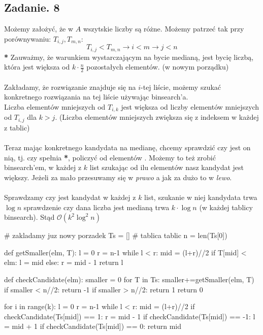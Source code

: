 \documentclass{article}
\begin{document}
\subsection*{Zadanie. 8}
Możemy założyć, że w $A$ wszytskie liczby są różne. Możemy patrzeć tak przy porównywaniu: $T_{i,j}, T_{m,n}$:
$$
T_{i,j} < T_{m,n} \rightarrow i < m \rightarrow j < n
$$
\textbf{*} Zauważmy, że warunkiem wystarczającym na bycie medianą, jest bycię liczbą, która jest większa od $k\cdot\frac{n}{2}$ pozostałych elementów. (w nowym porządku)\\\\
Zakładamy, że rozwiązanie znajduje się na $i$-tej liście, możemy szukać konkretnego rozwiązania na tej liście używając binsearch'a.\\Liczba elementów mniejszych od $T_{i,k}$ jest większa od liczby elementów mniejszych od $T_{i,j}$ dla $k>j$. (Liczba elementów mniejszych zwiększa się z indeksem w każdej z tablic)\\\\
Teraz mając konkretnego kandydata na medianę, chcemy sprawdzić czy jest on nią, tj. czy spełnia \textbf{*}, policzyć od elementów . Możemy to też zrobić binsearch'em, w każdej z $k$ list szukając od ilu elementów nasz kandydat jest większy.
Jeżeli za mało przesuwamy się w \textit{prawo} a jak za dużo to w \textit{lewo}.\\\\
Sprawdzamy czy jest kandydat w każdej z $k$ list, szukanie w niej kandydata trwa $\log{n}$ sprawdzenie czy dana liczba jest medianą trwa $k\cdot \log{n}$ (w każdej tablicy binsearch). Stąd $\mathcal{O}(k^2\log^2{n})$
\clearpage
\begin{python}
# zakladamy juz nowy porzadek
Ts = [] # tablica tablic
n = len(Ts[0])

def getSmaller(elm, T):
    l = 0
    r = n-1
    while l < r:
        mid = (l+r)//2
        if T[mid] < elm:
            l = mid
        else:
            r = mid - 1
    return l

def checkCandidate(elm):
    smaller = 0
    for T in Ts:
        smaller+=getSmaller(elm, T)
    if smaller < n//2:
        return -1
    if smaller > n//2:
        return 1
    return 0


for i in range(k):
    l = 0
    r = n-1
    while l < r:
        mid = (l+r)//2
        if checkCandidate(Ts[mid]) == 1:
            r = mid - 1
        if checkCandidate(Ts[mid]) == -1:
            l = mid + 1
        if checkCandidate(Ts[mid]) == 0:
            return mid
\end{python}
\end{document}
